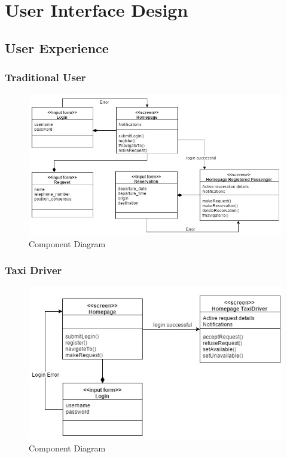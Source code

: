 \section{User Interface Design}
\subsection{User Experience}
\subsubsection{Traditional User}
\begin{figure}[h!]
	\begin{center}
		\includegraphics[width=1\linewidth]{../SE2_IMAGES/UserUX}
		\caption{Component Diagram}
	\end{center}
\end{figure}
\newpage
\subsubsection{Taxi Driver}
\begin{figure}[h!]
	\begin{center}
		\includegraphics[width=1\linewidth]{../SE2_IMAGES/TaxiUX}
		\caption{Component Diagram}
	\end{center}
\end{figure}